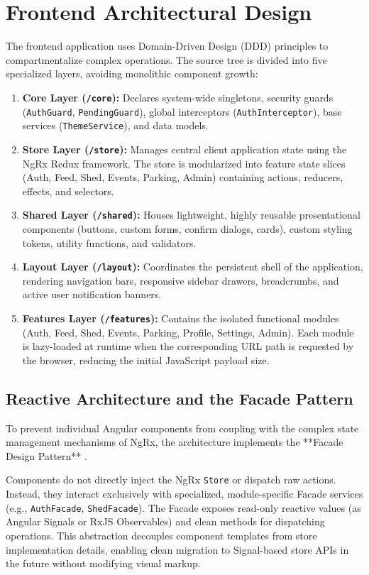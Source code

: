 \section{Frontend Architectural Design}
The frontend application uses Domain-Driven Design (DDD) principles to compartmentalize complex operations. The source tree is divided into five specialized layers, avoiding monolithic component growth:
\begin{enumerate}
    \item \textbf{Core Layer (\texttt{/core}):} Declares system-wide singletons, security guards (\texttt{AuthGuard}, \texttt{PendingGuard}), global interceptors (\texttt{AuthInterceptor}), base services (\texttt{ThemeService}), and data models.
    \item \textbf{Store Layer (\texttt{/store}):} Manages central client application state using the NgRx Redux framework. The store is modularized into feature state slices (Auth, Feed, Shed, Events, Parking, Admin) containing actions, reducers, effects, and selectors.
    \item \textbf{Shared Layer (\texttt{/shared}):} Houses lightweight, highly reusable presentational components (buttons, custom forms, confirm dialogs, cards), custom styling tokens, utility functions, and validators.
    \item \textbf{Layout Layer (\texttt{/layout}):} Coordinates the persistent shell of the application, rendering navigation bars, responsive sidebar drawers, breadcrumbs, and active user notification banners.
    \item \textbf{Features Layer (\texttt{/features}):} Contains the isolated functional modules (Auth, Feed, Shed, Events, Parking, Profile, Settings, Admin). Each module is lazy-loaded at runtime when the corresponding URL path is requested by the browser, reducing the initial JavaScript payload size.
\end{enumerate}

\subsection{Reactive Architecture and the Facade Pattern}
To prevent individual Angular components from coupling with the complex state management mechanisms of NgRx, the architecture implements the **Facade Design Pattern** \cite{gamma1994design}. 

Components do not directly inject the NgRx \texttt{Store} or dispatch raw actions. Instead, they interact exclusively with specialized, module-specific Facade services (e.g., \texttt{AuthFacade}, \texttt{ShedFacade}). The Facade exposes read-only reactive values (as Angular Signals or RxJS Observables) and clean methods for dispatching operations. This abstraction decouples component templates from store implementation details, enabling clean migration to Signal-based store APIs in the future without modifying visual markup.

